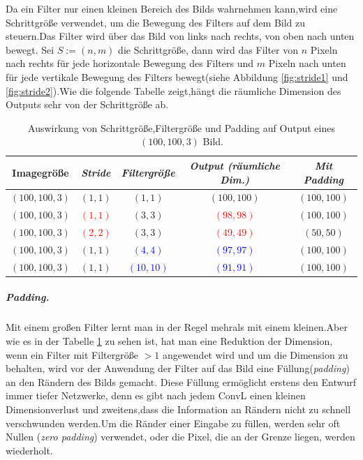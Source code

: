 \documentclass[12pt,a4paper]{scrartcl}
\numberwithin{equation}{section}
\begin{document}
	Da ein Filter nur einen kleinen Bereich des Bilds wahrnehmen kann,wird eine Schrittgröße verwendet, um die Bewegung des Filters auf dem Bild zu steuern.Das Filter wird über das Bild von links nach rechts, von oben nach unten bewegt. Sei $ S:=(n,m) $  die Schrittgröße, dann wird das Filter von $ n $ Pixeln nach rechts für jede horizontale Bewegung des Filters und $ m $ Pixeln nach unten für jede vertikale Bewegung des Filters bewegt(siehe Abbildung \ref{fig:stride1} und \ref{fig:stride2}).Wie die folgende Tabelle zeigt,hängt die räumliche Dimension des Outputs sehr von der Schrittgröße ab.
	
	\begin{table}[h]
		\centering
		\begin{tabular}{|c|c|c|c|c|}
			\hline
			\textbf{Imagegröße} & \textbf{\emph{Stride}} & \textbf{\emph{Filtergröße}} & \textbf{\textit{Output (räumliche Dim.)}}&\textbf{\emph{Mit Padding}}\\ \hline
			$ (100, 100, 3) $ &{$ (1,1) $ }& $ (1,1) $ &{$ (100,100) $ }&$ (100,100) $ \\ \hline
			$ (100, 100, 3) $ &\textcolor{red}{$ (1,1) $ }& $ (3,3) $ &\textcolor{red}{$ (98,98) $ }&$ (100,100) $ \\ \hline
			$ (100, 100, 3) $ &\textcolor{red}{$ (2, 2) $ } & $ (3,3) $ &\textcolor{red}{$ (49,49) $ }&$ (50,50) $ \\ \hline
			$ (100, 100, 3) $ &$ (1,1) $ & \textcolor{blue}{$ (4,4) $ }&\textcolor{blue}{$ (97, 97) $ } & $ (100, 100) $\\ \hline
			$ (100, 100, 3) $ &$ (1,1) $ & \textcolor{blue}{$ (10,10) $ }&\textcolor{blue}{$ (91, 91) $ } &$ (100, 100) $\\ \hline
		\end{tabular}
		\caption{Auswirkung von Schrittgröße,Filtergröße und Padding auf Output eines $ (100, 100, 3) $ Bild.}
		\label{tab:Stride and filter size}
	\end{table}
	
\subparagraph{\textit{Padding}.}
	Mit einem großen Filter lernt man in der Regel \dq mehr\dq als mit einem kleinen.Aber wie es in der Tabelle \ref{tab:Stride and filter size} zu sehen ist, hat man eine Reduktion der Dimension, wenn ein Filter mit Filtergröße $ >1 $ angewendet wird und um die Dimension zu behalten, wird vor der Anwendung der Filter auf das Bild eine Füllung(\textit{padding}) an den Rändern des Bilds gemacht. Diese Füllung ermöglicht erstens den Entwurf immer tiefer Netzwerke, denn es gibt nach jedem \ac{ConvL} einen kleinen Dimensionverlust und zweitens,dass die Information an Rändern nicht zu schnell verschwunden werden.Um die Ränder einer Eingabe zu füllen, werden sehr oft Nullen (\textit{zero padding}) verwendet, oder die Pixel, die an der Grenze liegen, werden wiederholt.\\
\end{document}
